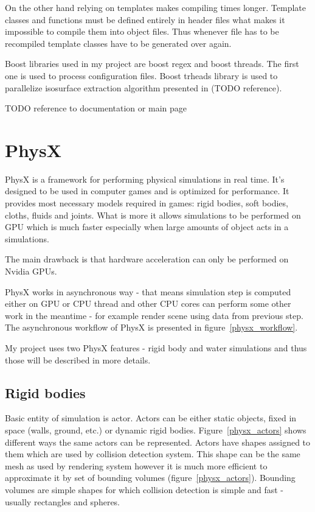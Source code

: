 On the other hand relying on templates makes compiling times longer. Template classes and functions must be defined entirely in header files what makes it impossible to compile them into object files. Thus whenever file has to be recompiled template classes have to be generated over again.

Boost libraries used in my project are boost regex and boost threads. The first one is used to process configuration files. Boost trheads library is used to parallelize isosurface extraction algorithm presented in (TODO reference).

TODO reference to documentation or main page

\section{PhysX}

PhysX is a framework for performing physical simulations in real time. It's designed to be used in computer games and is optimized for performance. It provides most necessary models required in games: rigid bodies, soft bodies, cloths, fluids and joints. What is more it allows simulations to be performed on GPU which is much faster especially when large amounts of object acts in a simulations.

The main drawback is that hardware acceleration can only be performed on Nvidia GPUs. 

PhysX works in asynchronous way - that means simulation step is computed either on GPU or CPU thread and other CPU cores can perform some other work in the meantime - for example render scene using data from previous step. The asynchronous workflow of PhysX is presented in figure~\ref{physx_workflow}.


My project uses two PhysX features - rigid body and water simulations and thus those will be described in more details. 

\subsection{Rigid bodies}

Basic entity of simulation is actor. Actors can be either static objects, fixed in space (walls, ground, etc.) or dynamic rigid bodies.
Figure~\ref{physx_actors} shows different ways the same actors can be represented. Actors have shapes assigned to them which are used by collision detection system. This shape can be the same mesh as used by rendering system however it is much more efficient to approximate it by set of bounding volumes (figure~\ref{physx_actors}). Bounding volumes are simple shapes for which collision detection is simple and fast - usually rectangles and spheres. 

